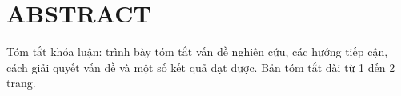 \chapter*{ABSTRACT}
\label{tomtat}

Tóm tắt khóa luận: trình bày tóm tắt vấn đề nghiên cứu, các hướng tiếp cận, cách giải quyết vấn đề và một số kết quả đạt được.
Bản tóm tắt dài từ 1 đến 2 trang.